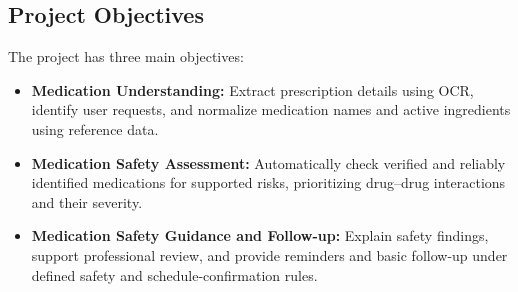 \subsection{Project Objectives}

The project has three main objectives:

\begin{itemize}
    \item \textbf{Medication Understanding:}
    Extract prescription details using OCR, identify user requests, and normalize medication names and active ingredients using reference data.

    \item \textbf{Medication Safety Assessment:}
    Automatically check verified and reliably identified medications for supported risks, prioritizing drug--drug interactions and their severity.
    
    \item \textbf{Medication Safety Guidance and Follow-up:}
    Explain safety findings, support professional review, and provide reminders and basic follow-up under defined safety and schedule-confirmation rules.
\end{itemize}
